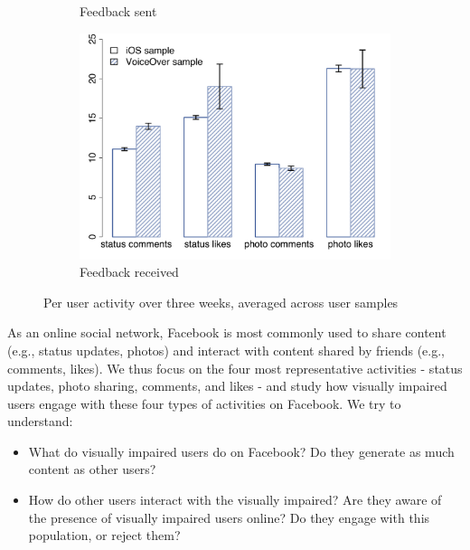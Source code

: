 \documentclass{sigchi}
\begin{document}
\begin{figure}[t]
\begin{subfigure}[b]{0.35\textwidth}
    \caption{Feedback sent}
    \label{fig:feedback_send}
 \end{subfigure}
\begin{subfigure}[b]{0.38\textwidth}
    \includegraphics[width=\columnwidth]{feedback_receive.pdf}
    \caption{Feedback received}
    \label{fig:feedback_receive}
 \end{subfigure}
\caption{Per user activity over three weeks, averaged across user samples}
\label{fig:activity}
\end{figure}


As an online social network, Facebook is most commonly used to share content (e.g., status updates, photos) and interact with content shared by friends (e.g., comments, likes).  We thus focus on the four most representative activities - status updates, photo sharing, comments, and likes - and study how visually impaired users engage with these four types of activities on Facebook. We try to understand:

\begin{itemize}
\item What do visually impaired users do on Facebook? Do they generate as much content as other users?
\item How do other users interact with the visually impaired? Are they aware of the presence of visually impaired users online? Do they engage with this population, or reject them?
\end{itemize}
\end{document}

